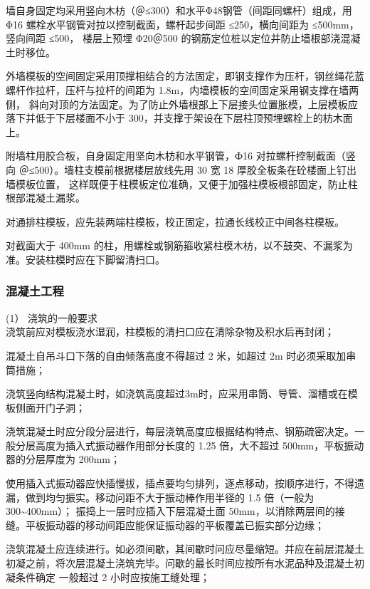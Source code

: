墙自身固定均采用竖向木枋（＠≤300）和水平Φ48钢管（间距同螺杆）组成，用 Φ16 螺栓水平钢管对拉以控制截面，螺杆起步间距 ≤250，横向间距为 ≤500mm，竖向间距 ≤500，
楼层上预埋 Φ20＠500 的钢筋定位桩以定位并防止墙根部浇混凝土时移位。

外墙模板的空间固定采用顶撑相结合的方法固定，即钢支撑作为压杆，钢丝绳花蓝螺杆作拉杆，压杆与拉杆的间距为 1.8m，内墙模板的空间固定采用钢支撑在墙两侧，
斜向对顶的方法固定。为了防止外墙根部上下层接头位置胀模，上层模板应落下并低于下层楼面不小于 300，并支撑于架设在下层柱顶预埋螺栓上的枋木面上。

附墙柱用胶合板，自身固定用坚向木枋和水平钢管，Ф16 对拉螺杆控制截面（竖向 ＠≤500）。墙柱支模前根据楼层放线先用 30 宽 18 厚胶全板条在砼楼面上钉出墙模板位置，
这样既便于柱模板定位准确，又便于加强柱模板根部固定，防止柱根部混凝土漏浆。

对通排柱模板，应先装两端柱模板，校正固定，拉通长线校正中间各柱模板。

对截面大于	400mm 的柱，用螺栓或钢筋箍收紧柱模木枋，以不鼓突、不漏浆为准。安装柱模时应在下脚留清扫口。


\subsubsection{混凝土工程}

(1） 浇筑的一般要求\\

 浇筑前应对模板浇水湿润，柱模板的清扫口应在清除杂物及积水后再封闭；

 混凝土自吊斗口下落的自由倾落高度不得超过 2 米，如超过 2m 时必须采取加串筒措施；

 浇筑竖向结构混凝土时，如浇筑高度超过3m时，应采用串筒、导管、溜槽或在模板侧面开门子洞；

 浇筑混凝土时应分段分层进行，每层浇筑高度应根据结构特点、钢筋疏密决定。一般分层高度为插入式振动器作用部分长度的 1.25 倍，大不超过 500mm，平板振动器的分层厚度为 200mm；

 使用插入式振动器应快插慢拔，插点要均匀排列，逐点移动，按顺序进行，不得遗漏，做到均匀振实。移动问距不大于振动棒作用半径的 1.5 倍（一般为 300\textasciitilde400mm）；
振捣上一层时应插入下层混凝土面 50mm，以消除两层间的接缝。平板振动器的移动间距应能保证振动器的平板覆盖已振实部分边缘；

 浇筑混凝土应连续进行。如必须间歇，其间歇时问应尽量缩短。并应在前层混凝土初凝之前，将次层混凝土浇筑完毕。问歇的最长时间应按所有水泥品种及混凝土初凝条件确定
一般超过 2 小时应按施工缝处理；

